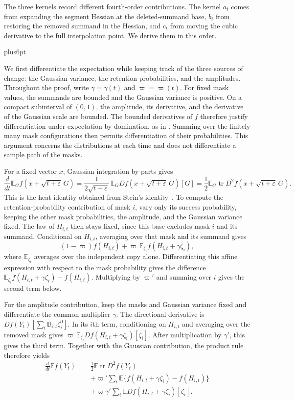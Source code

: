 \documentclass[11pt,letterpaper,twoside,leqno]{article}
\makeatletter
\theoremstyle{bookplain}
\theoremstyle{bookremark}
\renewenvironment{proof}[1][\proofname]{\par
  \pushQED{\qed}\normalfont\topsep6pt plus6pt\relax
  \trivlist\item[\hskip\labelsep\bfseries #1\@addpunct{.}]\ignorespaces
}{\popQED\endtrivlist\@endpefalse}
\newcommand{\E}{\mathbb E}
\newcommand{\tr}{\operatorname{tr}}
\makeatother
\begin{document}
The three kernels record different fourth-order contributions.
The kernel $a_t$ comes from expanding the segment Hessian at the
deleted-summand base, $b_t$ from restoring the removed summand in
the Hessian, and $c_t$ from moving the cubic derivative to the full
interpolation point. We derive them in this order.

\begin{proof}
We first differentiate the expectation while keeping track of the
three sources of change: the Gaussian variance, the retention
probabilities, and the amplitudes. Throughout the proof, write
\(\gamma=\gamma(t)\) and \(\varpi=\varpi(t)\).
For fixed mask values, the summands are bounded and the Gaussian
variance is positive. On a compact subinterval of \((0,1)\), the
amplitude, its derivative, and the derivative of the Gaussian scale
are bounded. The bounded derivatives of \(f\) therefore justify
differentiation under expectation by domination, as in
\cite[Section~2.3]{Folland1999}. Summing over the finitely many
mask configurations then permits differentiation of their
probabilities. This argument concerns the distributions at each
time and does not differentiate a sample path of the masks.

For a fixed vector \(x\), Gaussian integration by parts gives
\[
 \frac{d}{dt}\E_G f(x+\sqrt{t+\varepsilon}\,G)
 =\frac{1}{2\sqrt{t+\varepsilon}}\,
       \E_G Df(x+\sqrt{t+\varepsilon}\,G)[G]
 =\frac12\E_G\tr D^2f(x+\sqrt{t+\varepsilon}\,G).
\]
This is the heat identity obtained from
Stein's identity~\cite{Stein1981}.
To compute the retention-probability contribution of mask $i$,
vary only its success probability, keeping the other mask
probabilities, the amplitude, and the Gaussian variance fixed.
The law of $H_{i,t}$ then stays fixed, since this base excludes
mask $i$ and its summand. Conditional on $H_{i,t}$, averaging
over that mask and its summand gives
\[
 (1-\varpi)f(H_{i,t})
       +\varpi\,\E_{\zeta_i}f(H_{i,t}+\gamma\zeta_i),
\]
where \(\E_{\zeta_i}\) averages over the independent copy alone.
Differentiating this affine expression with respect to the mask
probability gives the difference
$\E_{\zeta_i}f(H_{i,t}+\gamma\zeta_i)-f(H_{i,t})$.
Multiplying by $\varpi'$ and summing over $i$ gives the second
term below.

For the amplitude contribution, keep the masks and Gaussian
variance fixed and differentiate the common multiplier $\gamma$.
The directional derivative is
$Df(Y_t)[\sum_i\mathbb B_{i,t}\zeta_i^0]$.
In its $i$th term, conditioning on $H_{i,t}$ and averaging over
the removed mask gives
$\varpi\,\E_{\zeta_i}Df(H_{i,t}+\gamma\zeta_i)[\zeta_i]$.
After multiplication by $\gamma'$, this gives the third term.
Together with the Gaussian contribution, the product rule
therefore yields
\begin{equation}
 \begin{aligned}
 \frac{d}{dt}\E f(Y_t)
 ={}&\frac12\E\tr D^2f(Y_t)\\
 &+\varpi'\sum_i\E\{f(H_{i,t}+\gamma\zeta_i)-f(H_{i,t})\}\\
 &+\varpi\gamma'\sum_i
       \E Df(H_{i,t}+\gamma\zeta_i)[\zeta_i].
 \end{aligned}
 \label{appx-an:three-contributions}
\end{equation}


\end{proof}
\end{document}
